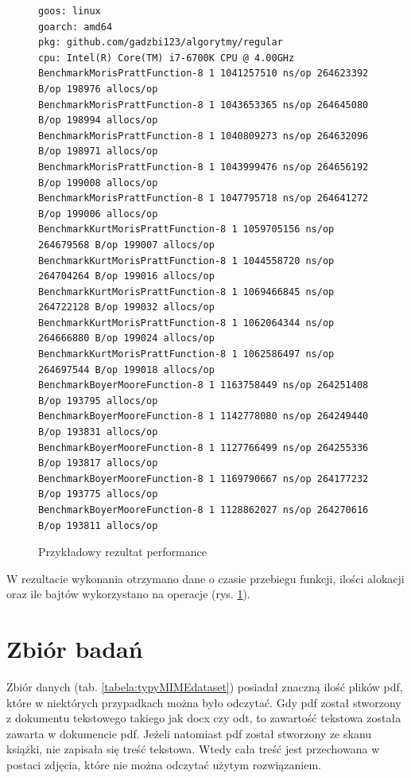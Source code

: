 \begin{figure}[htbp]
  \centering
  \begin{lstlisting}
goos: linux
goarch: amd64
pkg: github.com/gadzbi123/algorytmy/regular
cpu: Intel(R) Core(TM) i7-6700K CPU @ 4.00GHz
BenchmarkMorisPrattFunction-8 1	1041257510 ns/op 264623392 B/op 198976 allocs/op
BenchmarkMorisPrattFunction-8 1	1043653365 ns/op 264645080 B/op 198994 allocs/op
BenchmarkMorisPrattFunction-8 1	1040809273 ns/op 264632096 B/op 198971 allocs/op
BenchmarkMorisPrattFunction-8 1	1043999476 ns/op 264656192 B/op 199008 allocs/op
BenchmarkMorisPrattFunction-8 1	1047795718 ns/op 264641272 B/op 199006 allocs/op
BenchmarkKurtMorisPrattFunction-8 1	1059705156 ns/op 264679568 B/op 199007 allocs/op
BenchmarkKurtMorisPrattFunction-8 1	1044558720 ns/op 264704264 B/op 199016 allocs/op
BenchmarkKurtMorisPrattFunction-8 1	1069466845 ns/op 264722128 B/op 199032 allocs/op
BenchmarkKurtMorisPrattFunction-8 1	1062064344 ns/op 264666880 B/op 199024 allocs/op
BenchmarkKurtMorisPrattFunction-8 1	1062586497 ns/op 264697544 B/op 199018 allocs/op
BenchmarkBoyerMooreFunction-8 1	1163758449 ns/op 264251408 B/op 193795 allocs/op
BenchmarkBoyerMooreFunction-8 1	1142778080 ns/op 264249440 B/op 193831 allocs/op
BenchmarkBoyerMooreFunction-8 1	1127766499 ns/op 264255336 B/op 193817 allocs/op
BenchmarkBoyerMooreFunction-8 1	1169790667 ns/op 264177232 B/op 193775 allocs/op
BenchmarkBoyerMooreFunction-8 1	1128862027 ns/op 264270616 B/op 193811 allocs/op
  \end{lstlisting}
  \caption{Przykładowy rezultat performance}
  \label{fig:perfTestResults}
\end{figure}

W rezultacie wykonania otrzymano dane o czasie przebiegu funkcji, ilości 
alokacji oraz ile bajtów wykorzystano na operacje (rys. \ref{fig:perfTestResults}).

\section{Zbiór badań}

Zbiór danych (tab. \ref{tabela:typyMIMEdataset}) posiadał znaczną ilość 
plików pdf, które w niektórych przypadkach można było odczytać. Gdy pdf został
stworzony z dokumentu tekstowego takiego jak docx czy odt, to zawartość tekstowa
została zawarta w dokumencie pdf. Jeżeli natomiast pdf został stworzony ze skanu
książki, nie zapisała się treść tekstowa. Wtedy cała treść jest przechowana w 
postaci zdjęcia, które nie można odczytać użytym rozwiązaniem.

